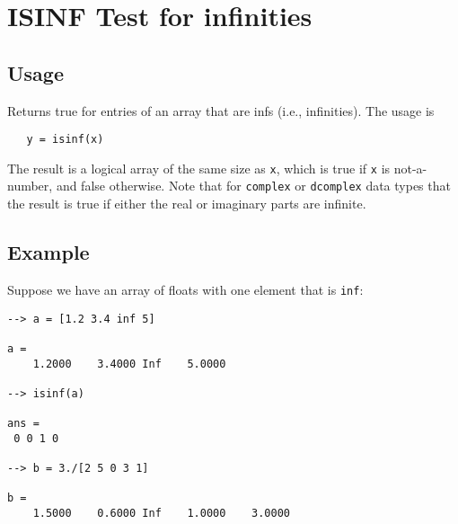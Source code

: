 \section{ISINF Test for infinities}

\subsection{Usage}

Returns true for entries of an array that are infs (i.e.,
infinities).  The usage is
\begin{verbatim}
   y = isinf(x)
\end{verbatim}
The result is a logical array of the same size as \verb|x|,
which is true if \verb|x| is not-a-number, and false otherwise.
Note that for \verb|complex| or \verb|dcomplex| data types that
the result is true if either the real or imaginary parts
are infinite.
\subsection{Example}

Suppose we have an array of floats with one element that
is \verb|inf|:
\begin{verbatim}
--> a = [1.2 3.4 inf 5]

a = 
    1.2000    3.4000 Inf    5.0000 

--> isinf(a)

ans = 
 0 0 1 0 

--> b = 3./[2 5 0 3 1]

b = 
    1.5000    0.6000 Inf    1.0000    3.0000 
\end{verbatim}
